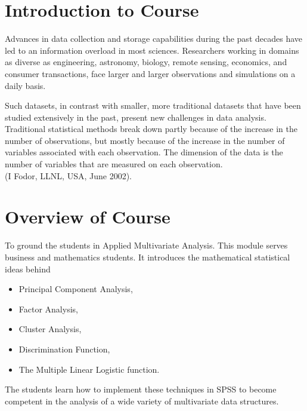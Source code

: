 \documentclass[a4paper,12pt]{article}
\begin{document}
\tableofcontents

\section{Introduction to Course}
Advances in data collection and storage capabilities during the past decades have led to an information
overload in most sciences. Researchers working in domains as diverse as engineering, astronomy, biology,
remote sensing, economics, and consumer transactions, face larger and larger observations and simulations
on a daily basis.

Such datasets, in contrast with smaller, more traditional datasets that have been studied
extensively in the past, present new challenges in data analysis. Traditional statistical methods break down
partly because of the increase in the number of observations, but mostly because of the increase in the
number of variables associated with each observation. The dimension of the data is the number of variables
that are measured on each observation.\\(I Fodor, LLNL, USA, June 2002).

\section{Overview of Course}

To ground the students in Applied Multivariate Analysis. This module serves business and mathematics students. It introduces the mathematical statistical ideas behind \begin{itemize} \item Principal Component Analysis, \item Factor Analysis, \item Cluster Analysis, \item Discrimination Function, \item The Multiple Linear Logistic function. \end{itemize}
The students learn how to implement these techniques in SPSS to become competent in the analysis of a wide variety of multivariate data structures.
\end{document}
